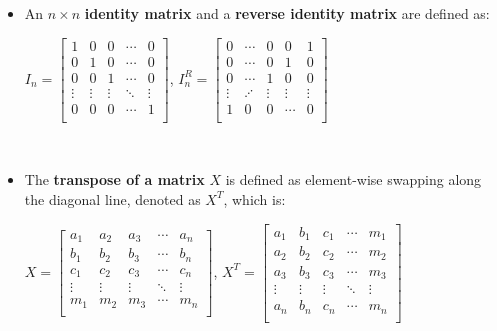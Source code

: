 \begin{tcolorbox}[title={\textbf{\tboxdef{\ref*{subsec:vandermonde}} Matrices}}]


\begin{itemize}

\item An $n \times n$ \textbf{identity matrix} and a \textbf{reverse identity matrix} are defined as:

$I_n = \begin{bmatrix}
1 & 0 & 0 & \cdots & 0\\
0 & 1 & 0 & \cdots & 0 \\
0 & 0 & 1 & \cdots & 0 \\
\vdots & \vdots & \vdots & \ddots & \vdots \\
0 & 0 & 0 & \cdots & 1 \\
\end{bmatrix}$, $I^R_n = \begin{bmatrix}
0 & \cdots & 0 & 0 & 1\\
0 & \cdots & 0 & 1 & 0 \\
0 & \cdots & 1 & 0 & 0 \\
\vdots & \iddots & \vdots & \vdots & \vdots \\
1 & 0 & 0 & \cdots & 0 \\
\end{bmatrix}$

$ $

\item The \textbf{transpose of a matrix} $X$ is defined as element-wise swapping along the diagonal line, denoted as $X^T$, which is:


$X = \begin{bmatrix}
a_1 & a_2 & a_3 & \cdots & a_n\\
b_1 & b_2 & b_3 & \cdots & b_n \\
c_1 & c_2 & c_3 & \cdots & c_n \\
\vdots & \vdots & \vdots & \ddots & \vdots \\
m_1 & m_2 & m_3 & \cdots & m_n \\
\end{bmatrix}$, $X^T = \begin{bmatrix}
a_1 & b_1 & c_1 & \cdots & m_1\\
a_2 & b_2 & c_2 & \cdots & m_2\\
a_3 & b_3 & c_3 & \cdots & m_3\\
\vdots & \vdots & \vdots & \ddots & \vdots \\
a_n & b_n & c_n & \cdots & m_n\\
\end{bmatrix}$


\end{itemize}
\end{tcolorbox}
